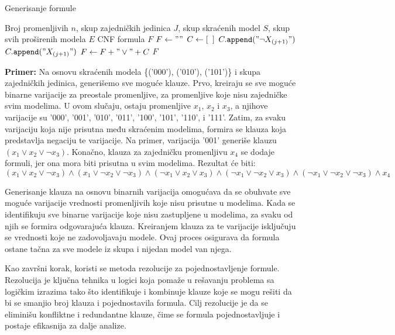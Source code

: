 \documentclass[12pt,oneside]{memoir}
\begin{document}
\begin{algorithm}[H]
\caption{Generisanje formule}
\renewcommand{\algorithmicrequire}{\textbf{Ulaz:}}
\renewcommand{\algorithmicensure}{\textbf{Izlaz:}}
\begin{algorithmic}[1]
\REQUIRE Broj promenljivih $n$, skup zajedničkih jedinica $J$, skup skraćenih model $S$, skup svih proširenih modela $E$
\ENSURE CNF formula $F$
\STATE $F \gets ""$
        \STATE $C \gets [\texttt{ \phantom{}}]$ 
                    \STATE $C.\texttt{append}("\neg X_{(j + 1)}")$
                \ELSE
                    \STATE $C.\texttt{append}("X_{(j + 1)}")$
                \ENDIF
            \ENDIF
        \ENDFOR
        \STATE $F \gets F + "\vee" + C$
    \ENDIF
\ENDFOR
\RETURN $F$
\end{algorithmic}
\end{algorithm}

\textbf{Primer:} Na osnovu skraćenih modela \{('000'), ('010'), ('101')\} i skupa zajedničkih jedinica, generišemo sve moguće klauze. Prvo, kreiraju se sve moguće binarne varijacije za preostale promenljive, za promenljive koje nisu zajedničke svim modelima. U ovom slučaju, ostaju promenljive $x_1$, $x_2$ i $x_3$, a njihove varijacije su '000', '001', '010', '011', '100', '101', '110', i '111'. Zatim, za svaku varijaciju koja nije prisutna među skraćenim modelima, formira se klauza koja predstavlja negaciju te varijacije. Na primer, varijacija '001' generiše klauzu $(x_1 \vee x_2 \vee \neg x_3)$. Konačno, klauza za zajedničku promenljivu $x_4$ se dodaje formuli, jer ona mora biti prisutna u svim modelima. Rezultat će biti:
\[
(x_1 \vee x_2 \vee \neg x_3) \wedge (x_1 \vee \neg x_2 \vee \neg x_3) \wedge (\neg x_1 \vee x_2 \vee x_3) \wedge (\neg x_1 \vee \neg x_2 \vee x_3) \wedge (\neg x_1 \vee \neg x_2 \vee \neg x_3) \wedge x_4
\]

Generisanje klauza na osnovu binarnih varijacija omogućava da se obuhvate sve moguće varijacije vrednosti promenljivih koje nisu prisutne u modelima. Kada se identifikuju sve binarne varijacije koje nisu zastupljene u modelima, za svaku od njih se formira odgovarajuća klauza. Kreiranjem klauza za te varijacije isključuju se vrednosti koje ne zadovoljavaju modele. Ovaj proces osigurava da formula ostane tačna za sve modele iz skupa i nijedan model van njega.


Kao završni korak, koristi se metoda rezolucije za pojednostavljenje formule. Rezolucija je ključna tehnika u logici koja pomaže u rešavanju problema sa logičkim izrazima tako što identifikuje i kombinuje klauze koje se mogu rešiti da bi se smanjio broj klauza i pojednostavila formula. Cilj rezolucije je da se eliminišu konfliktne i redundantne klauze, čime se formula pojednostavljuje i postaje efikasnija za dalje analize.
\end{document}
